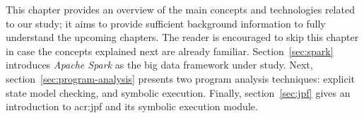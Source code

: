 \label{ch:relatedwork}

This chapter provides an overview of the main concepts and technologies related to our study; it aims to provide sufficient background information to fully understand the upcoming chapters. The reader is encouraged to skip this chapter in case the concepts explained next are already familiar. Section~\ref{sec:spark} introduces \textit{Apache Spark} as the big data framework under study. Next, section~\ref{sec:program-analysis} presents two program analysis techniques: explicit state model checking, and symbolic execution. Finally, section~\ref{sec:jpf} gives an introduction to \acrfull{acr:jpf} and its symbolic execution module.



